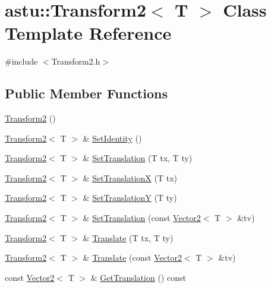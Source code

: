 \hypertarget{classastu_1_1Transform2}{}\section{astu\+:\+:Transform2$<$ T $>$ Class Template Reference}
\label{classastu_1_1Transform2}


{\ttfamily \#include $<$Transform2.\+h$>$}

\subsection*{Public Member Functions}
\begin{DoxyCompactItemize}
\item 
\hyperlink{classastu_1_1Transform2_ac4f230cba8e6862ab3348ea19305ef52}{Transform2} ()
\item 
\hyperlink{classastu_1_1Transform2}{Transform2}$<$ T $>$ \& \hyperlink{classastu_1_1Transform2_ad1bb8dd413003a605456b022f43a3dad}{Set\+Identity} ()
\item 
\hyperlink{classastu_1_1Transform2}{Transform2}$<$ T $>$ \& \hyperlink{classastu_1_1Transform2_a94d83e295cc5fa029d17a2e2dfc0a6fc}{Set\+Translation} (T tx, T ty)
\item 
\hyperlink{classastu_1_1Transform2}{Transform2}$<$ T $>$ \& \hyperlink{classastu_1_1Transform2_a3276e4c024e2ca1fcb9a776ebee8152c}{Set\+TranslationX} (T tx)
\item 
\hyperlink{classastu_1_1Transform2}{Transform2}$<$ T $>$ \& \hyperlink{classastu_1_1Transform2_a7cb56f0940469decb9b6081a7c0defe4}{Set\+TranslationY} (T ty)
\item 
\hyperlink{classastu_1_1Transform2}{Transform2}$<$ T $>$ \& \hyperlink{classastu_1_1Transform2_a86b12fb6fb1e2a865b8b9f4e71feb450}{Set\+Translation} (const \hyperlink{classastu_1_1Vector2}{Vector2}$<$ T $>$ \&tv)
\item 
\hyperlink{classastu_1_1Transform2}{Transform2}$<$ T $>$ \& \hyperlink{classastu_1_1Transform2_a287bd819b87dba7b75a739a63ef90aeb}{Translate} (T tx, T ty)
\item 
\hyperlink{classastu_1_1Transform2}{Transform2}$<$ T $>$ \& \hyperlink{classastu_1_1Transform2_aaa0fc40153ba380690ba312b59307b03}{Translate} (const \hyperlink{classastu_1_1Vector2}{Vector2}$<$ T $>$ \&tv)
\item 
const \hyperlink{classastu_1_1Vector2}{Vector2}$<$ T $>$ \& \hyperlink{classastu_1_1Transform2_a9ff5447e3d4e97f788c0f99094f19e5a}{Get\+Translation} () const

\end{DoxyCompactItemize}
